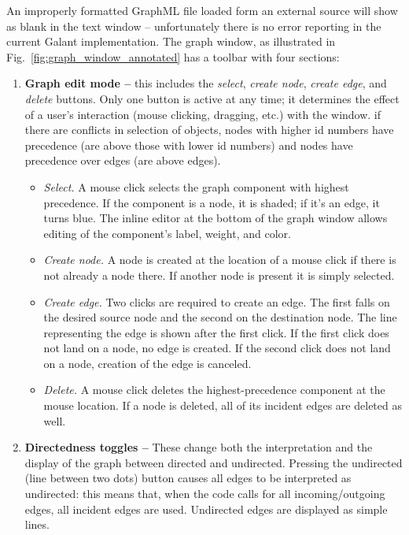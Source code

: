 An improperly formatted GraphML file loaded form an external source will
show as blank in the text window -- unfortunately there is no error
reporting in the current Galant implementation.
The graph window, as illustrated in Fig.~\ref{fig:graph_window_annotated}
has a toolbar with four sections:
\begin{enumerate}
\item
\textbf{Graph edit mode -- }
this includes the \emph{select}, \emph{create node}, \emph{create edge}, and \emph{delete} buttons.
Only one button is active at any time; it determines the effect
of a user's interaction (mouse clicking, dragging, etc.) with the window.
if there are conflicts in selection of objects, nodes with higher id numbers have precedence (are above those with lower id numbers) and nodes
have precedence over edges (are above edges).
\begin{itemize}
\item \emph{Select.} A mouse click selects the graph component with highest precedence.
If the component is a node, it is shaded; if it's an edge, it turns blue.
The inline editor at the bottom of the graph window allows editing of the
component's label, weight, and color.
\item \emph{Create node.}
A node is created at the location of a mouse click if there is not already a node there.
If another node is present it is simply selected.
\item \emph{Create edge.}
Two clicks are required to create an edge. The first falls on the desired
source node and the second on the destination node.
The line representing the edge is shown after the first click.
If the first click does not land on a node, no edge is created.
If the second click does not land on a node, creation of the edge is canceled.
\item \emph{Delete.}
A mouse click deletes the highest-precedence component at the mouse location.
If a node is deleted, all of its incident edges are deleted as well.
\end{itemize}

\item
\textbf{Directedness toggles --}
These change both the interpretation and the
display of the graph between directed and undirected.
Pressing the undirected (line between two dots) button causes
all edges to be interpreted as undirected: this means that, when the code
calls for all incoming/outgoing edges, all incident edges are used.
Undirected edges are displayed as simple lines.


\end{enumerate}

